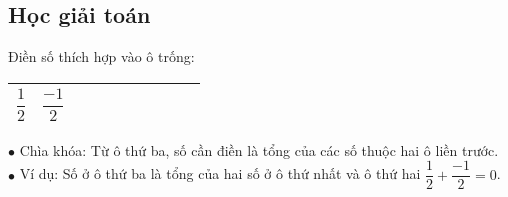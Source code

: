 \subsection{Học giải toán}
\begin{vd}%
	Điền số thích hợp vào ô trống: 
	\begin{center}
		\begin{tabular}{|c|c|c|c|c|c|c|c|c|c|}
			\hline
			$\dfrac{1}{2}$ & $\dfrac{-1}{2}$ & \sh{$0$} & \sh{$-0,5$} & \sh{$-1$} & \sh{$-1,5$} & \sh{$-2,5$}& \sh{$-4$} & \sh{$-6,5$}\\
			\hline
		\end{tabular}
	\end{center}
	 $\bullet$ Chìa khóa: Từ ô thứ ba, số cần điền là tổng của các số thuộc hai ô liền trước. \\
	 $\bullet$ Ví dụ: Số ở ô thứ ba là tổng của hai số ở ô thứ nhất và ô thứ hai $\dfrac{1}{2} + \dfrac{-1}{2} =0$.
\end{vd}
